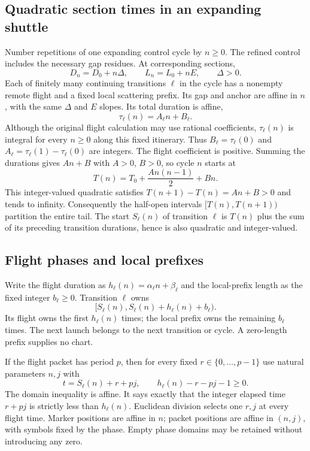 \documentclass[11pt,letterpaper]{article}
\numberwithin{equation}{section}
\theoremstyle{definition}
\theoremstyle{remark}
\begin{document}
\subsection{Quadratic section times in an expanding shuttle}
Number repetitions of one expanding control cycle by $n\ge0$. The refined
control includes the necessary gap residues. At corresponding sections,
\[
 D_n=D_0+n\Delta,\qquad L_n=L_0+nE,\qquad \Delta>0.
\]
Each of finitely many continuing transitions $\ell$ in the cycle has a
nonempty remote flight and a fixed local scattering prefix. Its gap and
anchor are affine in $n$, with the same $\Delta$ and $E$ slopes. Its total
duration is affine,
\[
 \tau_\ell(n)=A_\ell n+B_\ell.
\]
Although the original flight calculation may use rational coefficients,
$\tau_\ell(n)$ is integral for every $n\ge0$ along this fixed itinerary.
Thus $B_\ell=\tau_\ell(0)$ and
$A_\ell=\tau_\ell(1)-\tau_\ell(0)$ are integers. The flight coefficient is
positive. Summing the durations gives $An+B$ with $A>0$, $B>0$, so cycle
$n$ starts at
\begin{equation}\label{smc:tq:eq:T}
 T(n)=T_0+\frac{A n(n-1)}2+Bn.
\end{equation}
This integer-valued quadratic satisfies
$T(n+1)-T(n)=An+B>0$ and tends to infinity. Consequently the half-open
intervals $[T(n),T(n+1))$ partition the entire tail.
The start $S_\ell(n)$ of transition $\ell$ is $T(n)$ plus the sum of its
preceding transition durations, hence is also quadratic and integer-valued.

\subsection{Flight phases and local prefixes}
Write the flight duration as
$h_\ell(n)=\alpha_\ell n+\beta_\ell$ and the local-prefix length as the
fixed integer $b_\ell\ge0$. Transition $\ell$ owns
\[
 [S_\ell(n),S_\ell(n)+h_\ell(n)+b_\ell).
\]
Its flight owns the first $h_\ell(n)$ times; the local prefix owns the
remaining $b_\ell$ times. The next launch belongs to the next transition
or cycle. A zero-length prefix supplies no chart.

If the flight packet has period $p$, then for every fixed
$r\in\{0,\ldots,p-1\}$ use natural parameters $n,j$ with
\begin{equation}\label{smc:tq:eq:flight}
 t=S_\ell(n)+r+pj,\qquad h_\ell(n)-r-pj-1\ge0.
\end{equation}
The domain inequality is affine. It says exactly that the integer elapsed
time $r+pj$ is strictly less than $h_\ell(n)$. Euclidean division selects
one $r,j$ at every flight time. Marker positions are affine in $n$;
packet positions are affine in $(n,j)$, with symbols fixed by the phase.
Empty phase domains may be retained without introducing any zero.
\end{document}

